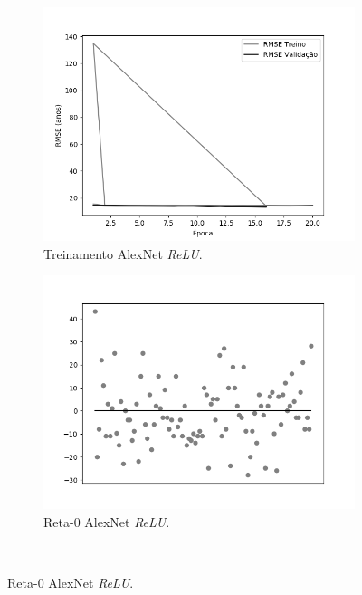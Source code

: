 	\begin{figure}[h!]
		\caption{Resultados do treinamento e teste da CNN AlexNet.}\label{fig:alexnet-abordagem2}
		\begin{subfigure}[hb]{0.5\linewidth}
			\caption{Treinamento AlexNet \emph{ReLU}.}
			\includegraphics[width=\linewidth]{img/graficos/history/alexnet/fig-history-image-treat-2-alexnet-relu-rmse.png}
		\end{subfigure}
		\begin{subfigure}[hb]{0.5\linewidth}
			\caption{Reta-0 AlexNet \emph{ReLU}.}
			\includegraphics[width=\linewidth]{img/graficos/reta0/alexnet/fig-reta-0-image-treat-2-alexnet-relu.png}%
		\end{subfigure}\\

\end{figure}
